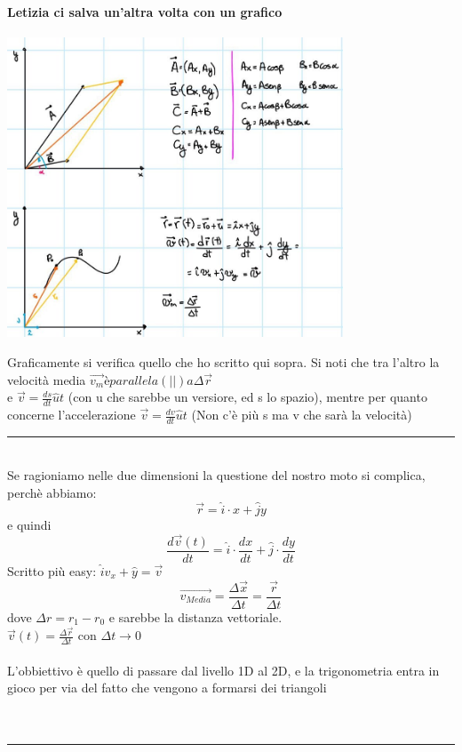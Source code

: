 \documentclass[12pt, a4paper, openany, oneside]{book}
\begin{document}
\paragraph{Letizia ci salva un'altra volta con un grafico}
\begin{center}
\includegraphics[width=0.75\textwidth]{sommaVettoriale}
\end{center}
Graficamente si verifica quello che ho scritto qui sopra. Si noti che tra l'altro
la velocità media
$\overrightarrow{v_{m}} è parallela (||) a \Delta \overrightarrow{r}$\\
e $\overrightarrow{v}=\frac{ds}{dt} \widehat{u}t $ (con u che sarebbe un 
versiore, ed s lo spazio), mentre per quanto concerne l'accelerazione 
$\overrightarrow{v}=\frac{dv}{dt} \widehat{u}t $ (Non c'è più s ma v che sarà
la velocità)
{\color{black} \rule{\linewidth}{0.3mm} }
\\
Se ragioniamo nelle due dimensioni la questione del nostro moto si complica, 
perchè abbiamo:
\[\overrightarrow{r} = \widehat{i}\cdot x + \widehat{j} y\] e quindi
\[\frac{d \overrightarrow{v} (t)}{dt} = \widehat{i} \cdot \frac{dx}{dt}+ 
\widehat{j} \cdot \frac{dy}{dt}\]
Scritto più easy: $\widehat{i} v_{x} + \widehat{y} = \overrightarrow{v}$
\[\overrightarrow{v_{Media}}= \frac{\Delta \overrightarrow{x}}{\Delta t} = 
\frac{\overrightarrow{r}}{\Delta t} \] dove $\Delta r = r_{1} - r_{0}$ e sarebbe
la distanza vettoriale.  \\ 
$\overrightarrow{v}(t) = \frac{\Delta \overrightarrow{r}}{\Delta t}$ con 
$\Delta t \to 0$
\\ \\ 
L'obbiettivo è quello di passare dal livello 1D al 2D, e la trigonometria entra
in gioco per via del fatto che vengono a formarsi dei triangoli
\\ \\
\\
{\color{black} \rule{\linewidth}{0.3mm} }
\end{document}
